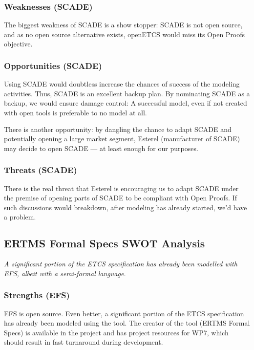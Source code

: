 \subsubsection{Weaknesses (SCADE)}

The biggest weakness of SCADE is a show stopper: SCADE is not open source, and as no open source alternative exists, openETCS would miss its Open Proofs objective.

\subsubsection{Opportunities (SCADE)}

Using SCADE would doubtless increase the chances of success of the modeling activities.  Thus, SCADE is an excellent backup plan.  By nominating SCADE as a backup, we would ensure damage control: A successful model, even if not created with open tools is preferable to no model at all.

There is another opportunity: by dangling the chance to adapt SCADE and potentially opening a large market segment, Esterel (manufacturer of SCADE) may decide to open SCADE --- at least enough for our purposes.

\subsubsection{Threats (SCADE)}

There is the real threat that Esterel is encouraging us to adapt SCADE under the premise of opening parts of SCADE to be compliant with Open Proofs.  If such discussions would breakdown, after modeling has already started, we'd have a problem.

\subsection{ERTMS Formal Specs SWOT Analysis}

\emph{A significant portion of the ETCS specification has already been modelled with EFS, albeit with a semi-formal language.}

\subsubsection{Strengths (EFS)}

EFS is open source.  Even better, a significant portion of the ETCS specification has already been modeled using the tool.  The creator of the tool (ERTMS Formal Specs) is available in the project and has project resources for WP7, which should result in fast turnaround during development.

